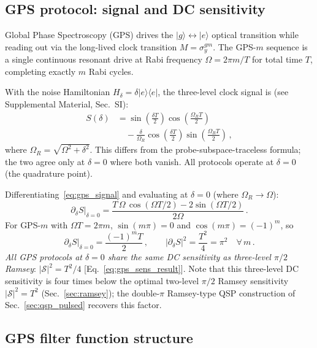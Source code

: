 \documentclass[aps,pra,twocolumn,superscriptaddress,longbibliography]{revtex4-2}
\newcommand{\be}{\begin{equation}}
\newcommand{\ee}{\end{equation}}
\begin{document}
\subsection{GPS protocol: signal and DC sensitivity}
\label{sec:gps}

Global Phase Spectroscopy (GPS) \cite{GPS} drives the $|g\rangle
\leftrightarrow|e\rangle$ optical transition while reading out via the
long-lived clock transition $M=\sigma_y^{gm}$.
The GPS-$m$ sequence is a single continuous resonant drive at Rabi frequency
$\Omega=2\pi m/T$ for total time $T$, completing exactly $m$ Rabi cycles.

With the noise Hamiltonian $H_\delta=\delta|e\rangle\langle e|$, the
three-level clock signal is (see Supplemental Material, Sec.~SI):
\begin{align}
  S(\delta) &= \sin\!\left(\frac{\delta T}{2}\right)
               \cos\!\left(\frac{\Omega_R T}{2}\right)
  \nonumber \\
            &\quad
             -\frac{\delta}{\Omega_R}
              \cos\!\left(\frac{\delta T}{2}\right)
              \sin\!\left(\frac{\Omega_R T}{2}\right)\,,
  \label{eq:gps_signal}
\end{align}
where $\Omega_R=\sqrt{\Omega^2+\delta^2}$.
This differs from the probe-subspace-traceless formula; the two agree only
at $\delta=0$ where both vanish.
All protocols operate at $\delta=0$ (the quadrature point).

Differentiating~\eqref{eq:gps_signal} and evaluating at $\delta=0$
(where $\Omega_R\to\Omega$):
\be
  \partial_\delta S\big|_{\delta=0}
  = \frac{T\,\Omega\,\cos(\Omega T/2) - 2\sin(\Omega T/2)}{2\Omega}\,.
  \label{eq:gps_deriv}
\ee
For GPS-$m$ with $\Omega T=2\pi m$, $\sin(m\pi)=0$ and
$\cos(m\pi)=(-1)^m$, so
\be
  \partial_\delta S\big|_{\delta=0} = \frac{(-1)^m T}{2}\,,
  \qquad
  |\partial_\delta S|^2 = \frac{T^2}{4} = \pi^2
  \quad\forall\,m\,.
  \label{eq:gps_sens_result}
\ee
\emph{All GPS protocols at $\delta=0$ share the same DC sensitivity as
three-level $\pi/2$ Ramsey}: $|\mathcal{S}|^2 = T^2/4$ [Eq.~\eqref{eq:gps_sens_result}].
Note that this three-level DC sensitivity is four times below the optimal two-level $\pi/2$
Ramsey sensitivity $|\mathcal{S}|^2 = T^2$ (Sec.~\ref{sec:ramsey});
the double-$\pi$ Ramsey-type QSP construction of Sec.~\ref{sec:qsp_pulsed} recovers this factor.

\subsection{GPS filter function structure}
\label{sec:gps_ff}
\end{document}
